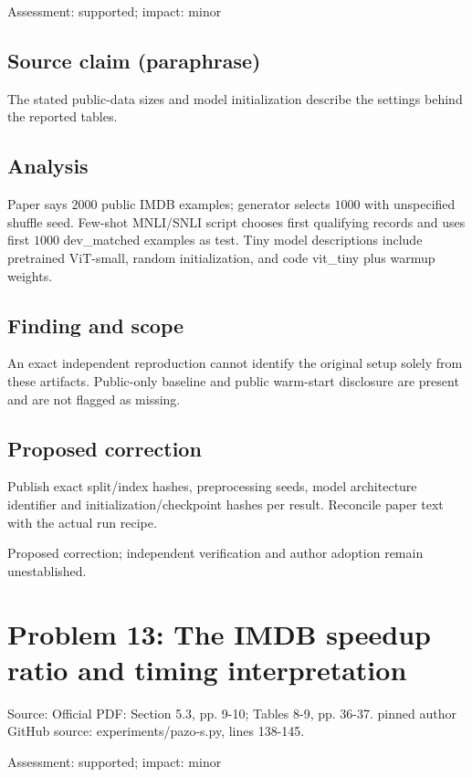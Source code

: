 \documentclass[11pt]{article}
\begin{document}
Assessment: supported; impact: minor

\subsection*{Source claim (paraphrase)}

The stated public-data sizes and model initialization describe the settings behind the reported tables.

\subsection*{Analysis}

Paper says \(2000\) public IMDB examples; generator selects \(1000\) with unspecified shuffle seed. Few-shot MNLI/SNLI script chooses first qualifying records and uses first \(1000\) dev\_matched examples as test. Tiny model descriptions include pretrained ViT-small, random initialization, and code vit\_tiny plus warmup weights.

\subsection*{Finding and scope}

An exact independent reproduction cannot identify the original setup solely from these artifacts. Public-only baseline and public warm-start disclosure are present and are not flagged as missing.

\subsection*{Proposed correction}

Publish exact split/index hashes, preprocessing seeds, model architecture identifier and initialization/checkpoint hashes per result. Reconcile paper text with the actual run recipe.

Proposed correction; independent verification and author adoption remain unestablished.

\section*{Problem 13: The IMDB speedup ratio and timing interpretation}

Source: Official PDF: Section 5.3, pp. 9-10; Tables 8-9, pp. 36-37. pinned author GitHub source: experiments/pazo-s.py, lines 138-145.

Assessment: supported; impact: minor
\end{document}
